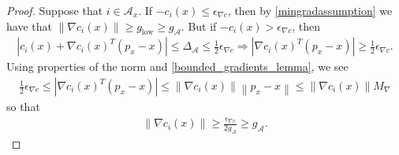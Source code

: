 \documentclass{article}
\theoremstyle{case}
\newcommand{\maxgrad}{{M_{\nabla}}}
\newcommand{\mingradepsilon}{{\epsilon_{\nabla c}}}
\newcommand{\mingrad}{{ g_{\text{low}} }}
\newcommand{\minactivegrad}{{ g_{\mathcal A} }}
\newcommand{\minactivegraddelta}{{\Delta_{\mathcal A}}}
\begin{document}
\begin{proof}
Suppose that $i \in \mathcal A_x$.
If $-c_i(x) \le \mingradepsilon$, then by \cref{mingradassumption} we have that $\|\nabla c_i(x)\| \ge \mingrad \ge \minactivegrad$.
But if $-c_i(x) > \mingradepsilon$, then
\begin{align*}
\left|c_i(x) + \nabla c_i(x)^T(p_x - x)\right| \le \minactivegraddelta \le \frac 1 2 \mingradepsilon
\Longrightarrow \left|\nabla c_i(x)^T(p_x - x)\right| \ge \frac 1 2 \mingradepsilon.
\end{align*}
Using properties of the norm and \cref{bounded_gradients_lemma}, we see
\begin{align*}
\frac 1 2 \mingradepsilon \le \left|\nabla c_i(x)^T(p_x - x)\right| \le \left\|\nabla c_i(x)\right\|\left\|p_x - x\right\| \le \left\|\nabla c_i(x)\right\| \maxgrad
\end{align*}
so that 
\begin{align*}
\left\|\nabla c_i(x)\right\| \ge \frac {\mingradepsilon} {2\minactivegrad} \ge \minactivegrad.
\end{align*}
\end{proof}
\end{document}
